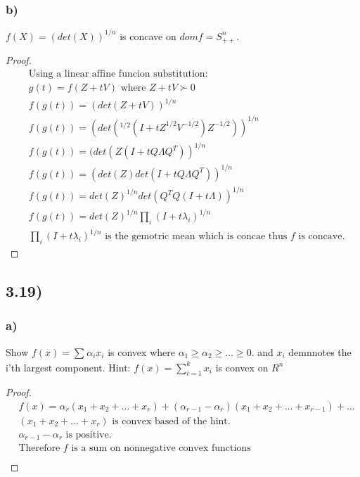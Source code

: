 \documentclass[12pt]{article}
\begin{document}
\subsubsection*{b)}

$f(X)= (det(X))^{1/n}$ is concave on $dom f = S^{n}_{++}$.

\begin{proof}
\begin{align*}
& \text{Using a linear affine funcion substitution:}\\
& g(t) = f(Z + tV) \text{ where } Z + tV \succ 0\\
& f(g(t)) = (det(Z + tV))^{1/n}\\
& f(g(t)) = (det(^{1/2}(I + tZ^{1/2}V^{-1/2})Z^{-1/2}))^{1/n}\\
& f(g(t)) = (det(Z(I + tQ\Lambda Q^T))^{1/n}\\
& f(g(t)) = (det(Z)det(I + tQ\Lambda Q^T))^{1/n}\\
& f(g(t)) = det(Z)^{1/n}det(Q^TQ(I + t\Lambda))^{1/n}\\
& f(g(t)) = det(Z)^{1/n}\prod_i(I + t\lambda_i)^{1/n}\\
& \text{$\prod_i(I + t\lambda_i)^{1/n}$ is the gemotric mean which is concae thus $f$ is concave.}
\end{align*}
\end{proof}

\subsection*{3.19)}
\subsubsection*{a)}

Show $f(x) = \sum_{}^{}\alpha_ix_i$ is convex where $\alpha_1 \ge \alpha_2 \ge \dots \ge 0$.
and $x_i$ demnnotes the i'th largest component. Hint: $f(x) = \sum_{i=1}^{k}x_i$ is convex on $R^n$

\begin{proof}
\begin{align*}
& f(x) = \alpha_r(x_1 + x_2 + \dots + x_r) + (\alpha_{r-1} - \alpha_r)(x_1 + x_2 + \dots + x_{r-1}) + \dots\\
& \text{$(x_1 + x_2 + \dots + x_r)$ is convex based of the hint.} \\
& \text{$\alpha_{r-1} - \alpha_r$ is positive.}\\
& \text{Therefore $f$ is a sum on nonnegative convex functions}\\
\end{align*}
\end{proof}
\end{document}
